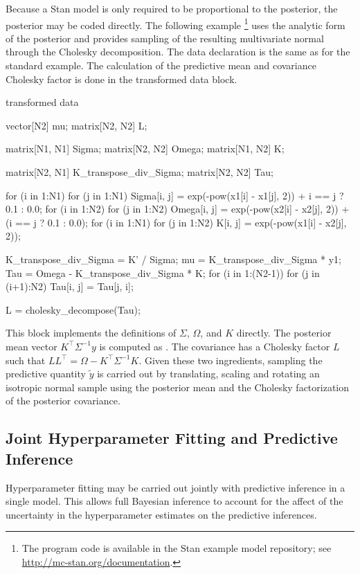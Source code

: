 Because a Stan model is only required to be proportional to the
posterior, the posterior may be coded directly.  The following
example%
%
\footnote{The program code is available in the Stan example model repository;
see \url{http://mc-stan.org/documentation}.}
%
uses the analytic form of the posterior and provides sampling of the
resulting multivariate normal through the Cholesky decomposition.
The data declaration is the same as for the standard example.  The
calculation of the predictive mean  and covariance Cholesky
factor  is done in the transformed data block.
%
\begin{stancode}
transformed data {
  vector[N2] mu;
  matrix[N2, N2] L;
  { 
    matrix[N1, N1] Sigma;
    matrix[N2, N2] Omega;
    matrix[N1, N2] K;
    
    matrix[N2, N1] K_transpose_div_Sigma;
    matrix[N2, N2] Tau;

    for (i in 1:N1) 
      for (j in 1:N1)
        Sigma[i, j] = exp(-pow(x1[i] - x1[j], 2)) 
          + i == j ? 0.1 : 0.0;
    for (i in 1:N2) 
      for (j in 1:N2)
        Omega[i, j] = exp(-pow(x2[i] - x2[j], 2)) 
          + (i == j ? 0.1 : 0.0);
    for (i in 1:N1)
      for (j in 1:N2)
        K[i, j] = exp(-pow(x1[i] - x2[j], 2));
    
    K_transpose_div_Sigma = K' / Sigma;
    mu = K_transpose_div_Sigma * y1; 
    Tau = Omega - K_transpose_div_Sigma * K;
    for (i in 1:(N2-1))
      for (j in (i+1):N2)
        Tau[i, j] = Tau[j, i];

    L = cholesky_decompose(Tau);
  }
}
\end{stancode}
%
This block implements the definitions of $\Sigma$, $\Omega$, and $K$
directly.  The posterior mean vector $K^{\top}\Sigma^{-1}y$ is
computed as .  The covariance has a Cholesky factor $L$ such
that $LL^{\top} = \Omega - K^{\top}\Sigma^{-1}K$.  Given these two
ingredients, sampling the predictive quantity $\tilde{y}$ is carried
out by translating, scaling and rotating an isotropic normal sample 
using the posterior mean and the Cholesky factorization of the
posterior covariance.


\subsection{Joint Hyperparameter Fitting and Predictive Inference}

Hyperparameter fitting may be carried out jointly with predictive
inference in a single model.  This allows full Bayesian inference to
account for the affect of the uncertainty in the hyperparameter
estimates on the predictive inferences.  


